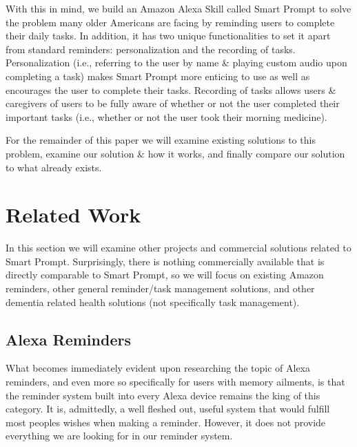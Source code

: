 \documentclass[conference]{IEEEtran}
\begin{document}
With this in mind, we build an Amazon Alexa Skill called Smart Prompt to solve the problem many older Americans are facing by reminding users to complete their daily tasks. 
In addition, it has two unique functionalities to set it apart from standard reminders: personalization and the recording of tasks. 
Personalization (i.e., referring to the user by name \& playing custom audio upon completing a task) makes Smart Prompt more enticing to use as well as encourages the user to complete their tasks. 
Recording of tasks allows users \& caregivers of users to be fully aware of whether or not the user completed their important tasks (i.e., whether or not the user took their morning medicine). 

For the remainder of this paper we will examine existing solutions to this problem, examine our solution \& how it works, and finally compare our solution to what already exists. 


\section{Related Work}

In this section we will examine other projects and commercial solutions related to Smart Prompt. 
Surprisingly, there is nothing commercially available that is directly comparable to Smart Prompt, so we will focus on existing Amazon reminders, other general reminder/task management solutions, and other dementia related health solutions (not specifically task management). 

\subsection{Alexa Reminders}

What becomes immediately evident upon researching the topic of Alexa reminders, and even more so specifically for users with memory ailments, is that the reminder system built into every Alexa device remains the king of this category. 
It is, admittedly, a well fleshed out, useful system that would fulfill most peoples wishes when making a reminder. 
However, it does not provide everything we are looking for in our reminder system. 
\end{document}
